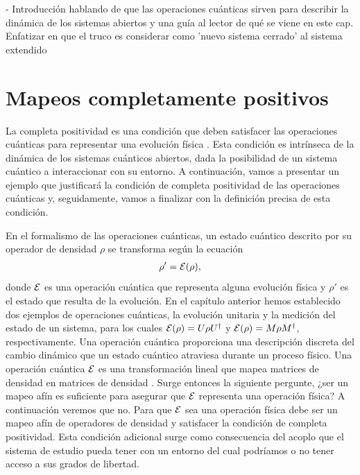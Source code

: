 - Introducción hablando de que las operaciones cuánticas sirven 
para describir la dinámica de los sistemas abiertos y una guía al 
lector de qué se viene en este cap. Enfatizar en que el truco es 
considerar como 'nuevo sistema cerrado' al sistema extendido
\section{Mapeos completamente positivos}
%

La completa positividad es una condición que deben satisfacer las operaciones
cuánticas para representar una evolución física 
\cite{bengtsson_zyczkowski_2017}. Esta condición es
intrínseca de la dinámica de los sistemas cuánticos abiertos, dada la 
posibilidad de un sistema cuántico a interaccionar con su entorno. A
continuación, vamos a presentar un ejemplo que justificará la condición
de completa positividad de las operaciones cuánticas y, seguidamente,
vamos a finalizar con la definición precisa de esta condición.

En el formalismo de las operaciones cuánticas, un estado cuántico
descrito por su operador de densidad $\rho$
se transforma según la ecuación \cite{nielsen_chuang_2011}
\begin{align}
\rho' = \mathcal{E} (\rho)
\label{eq:E(rho)},
\end{align} 
donde $\mathcal{E}$ es una operación cuántica que representa alguna evolución 
física y $\rho'$ es el estado que resulta de la evolución. 
En el capítulo anterior hemos 
establecido dos ejemplos de operaciones cuánticas, la evolución unitaria 
y la medición del estado de un sistema, 
para los cuales $\mathcal{E} \qty(\rho)=U\rho U^{\dagger}$ y 
$\mathcal{E}(\rho)=M\rho M^{\dagger}$, respectivamente. 
Una operación cuántica proporciona
una descripción discreta del cambio dinámico que un estado cuántico 
atraviesa durante un proceso físico. Una operación cuántica $\mathcal{E}$ es
una transformación lineal que mapea matrices de densidad en matrices 
de densidad \cite{bengtsson_zyczkowski_2017}. Surge entonces la siguiente
pergunte, ¿ser un mapeo afín es
suficiente para asegurar que $\mathcal{E}$ representa una operación física?
A continuación veremos que no.  Para que $\mathcal{E}$ sea una operación física 
debe ser un mapeo afín de operadores de densidad 
y satisfacer la condición de completa positividad. Esta condición
adicional surge como consecuencia del acoplo que el sistema de estudio
pueda tener con un entorno del cual podríamos o no tener acceso a sus
grados de libertad.


